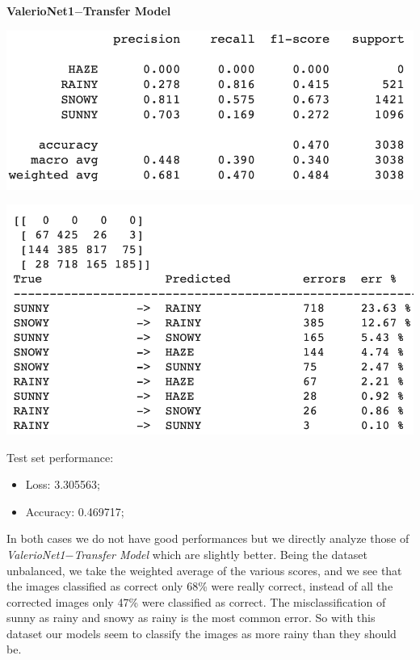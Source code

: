 \documentclass[12pt]{article}
\begin{document}
\bigskip
{\bf ValerioNet1$-$Transfer Model} \newline
\begin{minipage}[c]{.5\textwidth}
   \centering
   \includegraphics[width=\textwidth]{pic10}
\end{minipage}
\hspace{1em}
\begin{minipage}[c]{.5\textwidth}
   \centering
   \includegraphics[width=\textwidth]{pic11}
\end{minipage}

Test set performance:
\begin{itemize}
    \item Loss: 3.305563;
    \item Accuracy: 0.469717;
\end{itemize}

In both cases we do not have good performances but we directly analyze those of {\em ValerioNet1$-$Transfer Model} which are slightly better.
Being the dataset unbalanced, we take the weighted average of the various scores, and we see that the images classified as correct only 68\% were really correct, instead of all the corrected images only 47\% were classified as correct. The misclassification of sunny as rainy and snowy as rainy is the most common error. So with this dataset our models seem to classify the images as more rainy than they should be.
\end{document}
